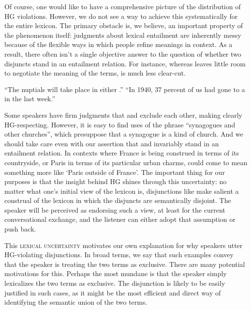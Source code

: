 \documentclass[12pt,twoside]{article}
\renewcommand{\_}{\textbf{\textunderscore\hspace{-4pt}\textunderscore\hspace{-3pt}\textunderscore\hspace{-4pt}\textunderscore}\hspace{0.5pt}}			%
\newcommand{\technicalTerm}[1]{\textsc{#1}}
\begin{document}
Of course, one would like to have a comprehensive picture of the
distribution of HG violations. However, we do not see a way to achieve
this systematically for the entire lexicon. The primary obstacle is,
we believe, an important property of the phenomenon itself: judgments
about lexical entailment are inherently messy because of the flexible
ways in which people refine meanings in context. As a result, there
often isn't a single objective answer to the question of whether two
disjuncts stand in an entailment relation. For instance, whereas
 leaves little room to negotiate the
meaning of the terms,  is much
less clear-cut.
%
\begin{exe}
\ex\label{exclusive}
  \begin{xlist}
  \ex\label{franceorparis} ``The nuptials will take place in either
    .''
  \ex\label{churchorsynagogue} ``In 1940, 37 percent of us had gone
    to a  in the last week.''
  \end{xlist}
\end{exe}
%
Some speakers have firm judgments that  and
 exclude each other, making
 clearly HG-respecting. However,
it is easy to find uses of the phrase ``synagogues and other
churches'', which presuppose that a synagogue is a kind of church. And
we should take care even with our assertion that  and
 invariably stand in an entailment relation. In contexts
where France is being construed in terms of its countryside, or Paris
in terms of its particular urban charms,  could come to
mean something more like `Paris outside of France'. The important
thing for our purposes is that the insight behind HG shines through
this uncertainty: no matter what one's initial view of the lexicon is,
disjunctions like  make salient a construal of the
lexicon in which the disjuncts are semantically disjoint. The speaker
will be perceived as endorsing such a view, at least for the current
conversational exchange, and the listener can either adopt that
assumption or push back.

This \technicalTerm{lexical uncertainty} motivates our own explanation for why
speakers utter HG-violating disjunctions. In broad terms, we say that
such examples convey that the speaker is treating the two terms as
exclusive. There are many potential motivations for this. Perhaps the
most mundane is that the speaker simply lexicalizes the two terms as
exclusive. The disjunction is likely to be easily justified in such
cases, as it might be the most efficient and direct way of identifying
the semantic union of the two terms.
\end{document}
